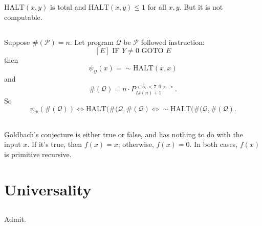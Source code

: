 \subsection{}
$ \mathrm{HALT}(x,y) $ is total and $ \mathrm{HALT}(x,y) \le 1 $ for all $ x,y $.
But it is not computable.


\subsection{}
Suppose $\#(\mathscr{P}) = n $.
Let program $\mathscr{Q}$ be $\mathscr{P}$ followed instruction:
\[ [E] \text{ IF } Y \neq 0 \text{ GOTO } E \]
then
\[ \psi_{\mathscr{Q}}(x) = \sim \mathrm{HALT}(x,x) \]
and
\[ \#(\mathscr{Q}) = n\cdot P_{Lt(n)+1}^{<5,<7,0>>} .\]
So
\[ \psi_{\mathscr{P}}(\#(\mathscr{Q}))
   \Leftrightarrow \mathrm{HALT}(\#(\mathscr{Q}, \#(\mathscr{Q})
   \Leftrightarrow \sim \mathrm{HALT}(\#(\mathscr{Q}, \#(\mathscr{Q}) .\]


\subsection{}
Goldbach's conjecture is either true or false, and has nothing to do with
the input $x$. If it's true, then $ f(x) = x $; otherwise, $ f(x) = 0 $.
In both cases, $f(x)$ is primitive recursive.



\section{Universality}

\subsection{}
Admit.

